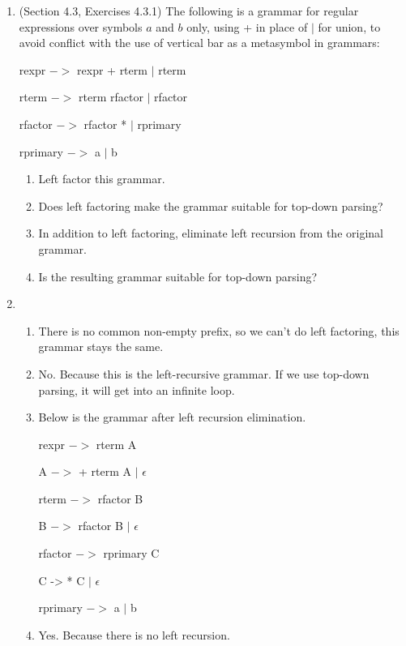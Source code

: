 \documentclass[12pt,a4paper]{article}
\makeatletter
\newtheorem*{solution}{Solution}
\renewenvironment{solution}[1][Solution] {\par\pushQED{\qed}\normalfont\topsep6\p@\@plus6\p@\relax\trivlist\item[\hskip\labelsep\bfseries#1\@addpunct{.}]\ignorespaces}{\popQED\endtrivlist\@endpefalse} \makeatother
\makeatother
\begin{document}
\begin{enumerate}
\newpage
\textrm{\\}

\item (Section 4.3, Exercises 4.3.1) The following is a grammar for regular expressions over symbols $a$ and $b$ only, using + in place of $|$ for union, to avoid conflict with the use of vertical bar as a metasymbol in grammars:
    \begin{center}
    rexpr $->$ rexpr + rterm $|$ rterm
    
    rterm $->$ rterm rfactor $|$ rfactor
    
    rfactor $->$ rfactor * $|$ rprimary
    
    rprimary $->$ a $|$ b
    \end{center}

    \begin{enumerate}
    \item Left factor this grammar.
    \item Does left factoring make the grammar suitable for top-down parsing?
    \item In addition to left factoring, eliminate left recursion from the original grammar.
    \item Is the resulting grammar suitable for top-down parsing?
    \end{enumerate}

\begin{solution}
    \textrm{\\}
    \begin{enumerate}
    \item There is no common non-empty prefix, so we can't do left factoring, this grammar stays the same.
    \item No. Because this is the left-recursive grammar. If we use top-down parsing, it will get into an infinite loop.
    \item Below is the grammar after left recursion elimination.
    \begin{center}
    rexpr $->$ rterm A

    A $->$ + rterm A $|$ $\epsilon$
    
    rterm $->$ rfactor B

    B $->$ rfactor B $|$ $\epsilon$
    
    rfactor $->$ rprimary C
    
    C -> * C $|$ $\epsilon$

    rprimary $->$ a $|$ b
    \end{center}
    \item Yes. Because there is no left recursion.
    \end{enumerate}


\end{solution}
\end{enumerate}
\end{document}

